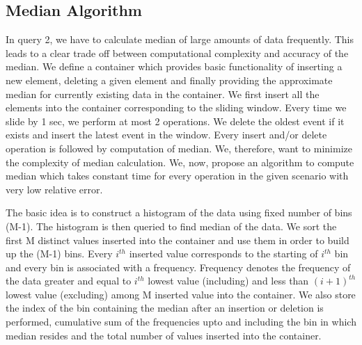 \subsection{Median Algorithm}
In query 2, we have to calculate median of large amounts of data frequently. This leads to a clear trade off between computational complexity and accuracy of the median. We define a container which provides basic functionality of inserting a new element, deleting a given element and finally providing the approximate median for currently existing data in the container. We first insert all the elements into the container corresponding to the sliding window. Every time we slide by 1 sec, we perform at most 2 operations. We delete the oldest event if it exists and insert the latest event in the window. Every insert and/or delete operation is followed by computation of median. We, therefore, want to minimize the complexity of median calculation. We, now, propose an algorithm to compute median which takes constant time for every operation in the given scenario with very low relative error.

The basic idea is to construct a histogram of the data using fixed number of bins (M-1). The histogram is then queried to find median of the data. We sort the first M distinct values inserted into the container and use them in order to build up the (M-1) bins. Every $i^{th}$ inserted value corresponds to the starting of $i^{th}$ bin and every bin is associated with a frequency. Frequency denotes the frequency of the data greater and equal to $i^{th}$ lowest value (including) and less than $(i+1)^{th}$ lowest value (excluding) among M inserted value into the container. We also store the index of the bin containing the median after an insertion or deletion is performed, cumulative sum of the frequencies upto and including the bin in which median resides and the total number of values inserted into the container.

